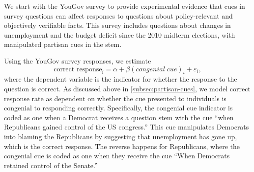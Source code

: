 \documentclass[12pt, letterpaper]{article}
\begin{document}
We start with the YouGov survey to provide experimental evidence that cues in survey questions can affect responses to questions about policy-relevant and objectively verifiable facts. This survey includes questions about changes in unemployment and the budget deficit since the 2010 midterm elections, with manipulated partisan cues in the stem. 

Using the YouGov survey responses, we estimate
\begin{equation}\label{eq:pgap-yougov}
\text{correct response}_{i} = \alpha + \beta (congenial \; cue)_i  +\varepsilon_{i},
\end{equation}
where the dependent variable is the indicator for whether the response to the question is correct.
As discussed above in \cref{subsec:partisan-cues}, we model correct response rate as dependent on whether the cue presented to individuals is congenial to responding correctly.
Specifically, the congenial cue indicator is coded as one when a Democrat receives a question stem with the cue ``when Republicans gained control of the US congress.'' This cue manipulates Democrats into blaming the Republicans by suggesting that unemployment has gone up, which is the correct response.
The reverse happens for Republicans, where the congenial cue is coded as one when they receive the cue ``When Democrats retained control of the Senate.''
\end{document}
